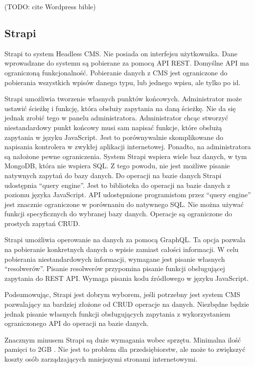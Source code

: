 (TODO: cite Wordpress bible)

\subsection{Strapi}

Strapi to system Headless CMS. Nie posiada on interfejsu użytkownika. Dane
wprowadzane do systemu są pobierane za pomocą API REST. Domyślne API ma
ograniczoną funkcjonalność. Pobieranie danych z CMS jest ograniczone do
pobierania wszystkich wpisów danego typu, lub jednego wpisu, ale tylko po id.

Strapi umożliwia tworzenie własnych punktów końcowych. Administrator może ustawić
ścieżkę i funkcję, która obsłuży zapytania na daną ścieżkę. Nie da się jednak
zrobić tego w panelu administratora. Administrator chcąc stworzyć niestandardowy
punkt końcowy musi sam napisać funkcje, które obsłużą zapytania w języku
JavaScript. Jest to porównywalnie skomplikowane do napisania kontrolera w
zwykłej aplikacji internetowej. Ponadto, na administratora są nałożone pewne
ograniczenia. System Strapi wspiera wiele baz danych, w tym MongoDB, która nie
wspiera SQL. Z tego powodu, nie jest możliwe pisanie natywnych zapytań do bazy
danych. Do operacji na bazie danych Strapi udostępnia ``query engine''. Jest to
biblioteka do operacji na bazie danych z poziomu języka JavaScript. API
udostępnione programistom przez ``query engine'' jest znacznie ograniczone w
porównaniu do natywnego SQL. Nie można używać funkcji specyficznych do wybranej
bazy danych. Operacje są ograniczone do prostych zapytań CRUD.

Strapi umożliwia operowanie na danych za pomocą GraphQL. Ta opcja pozwala na
pobieranie konkretnych danych o wpisie zamiast całości informacji. W celu
pobierania niestandardowych informacji, wymagane jest pisanie własnych
``resolwerów''. Pisanie resolwerów przypomina pisanie funkcji obsługującej
zapytania do REST API. Wymaga pisania kodu źródłowego w języku JavaScript.

Podsumowując, Strapi jest dobrym wyborem, jeśli potrzebny jest system CMS
pozwalający na bardziej złożone od CRUD operacje na danych. Niezbędne będzie
jednak pisanie własnych funkcji obsługujących zapytania z wykorzystaniem
ograniczonego API do operacji na bazie danych.

Znacznym minusem Strapi są duże wymagania wobec sprzętu. Minimalna ilość pamięci
to 2GB \cite{StrapiDeployment}. Nie jest to problem dla przedsiębiorstw, ale
może to zwiększyć koszty osób zarządzających mniejszymi stronami internetowymi.

